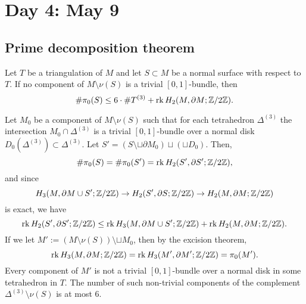\documentclass{../../../small}
\begin{document}
\newpage
\section{Day 4: May 9}
\setcounter{section}{3}
\setcounter{subsection}{3}
\setcounter{thm}{7}

\subsection{Prime decomposition theorem}
\begin{prop}
Let $T$ be a triangulation of $M$ and let $S\subset M$ be a normal surface with respect to $T$.
If no component of $M\setminus\nu(S)$ is a trivial $[0,1]$-bundle, then
\[\#\pi_0(S)\le6\cdot\#T^{(3)}+\operatorname{rk} H_2(M,\partial M;\mathbb{Z}/2\mathbb{Z}).\]
\end{prop}
\begin{pf}
Let $M_0$ be a component of $M\setminus\nu(S)$ such that for each tetrahedron $\Delta^{(3)}$ the intersection $M_0\cap\Delta^{(3)}$ is a trivial $[0,1]$-bundle over a normal disk $D_0(\Delta^{(3)})\subset\Delta^{(3)}$.
Let $S'=(S\setminus\sqcup\partial M_0)\sqcup(\sqcup D_0)$.
Then,
\[\#\pi_0(S)=\#\pi_0(S')=\operatorname{rk} H_2(S',\partial S';\mathbb{Z}/2\mathbb{Z}),\]
and since
\[H_3(M,\partial M\cup S';\mathbb{Z}/2\mathbb{Z})\to H_2(S',\partial S;\mathbb{Z}/2\mathbb{Z})\to H_2(M,\partial M;\mathbb{Z}/2\mathbb{Z})\]
is exact, we have
\[\operatorname{rk} H_2(S',\partial S';\mathbb{Z}/2\mathbb{Z})\le\operatorname{rk} H_3(M,\partial M\cup S';\mathbb{Z}/2\mathbb{Z})+\operatorname{rk} H_2(M,\partial M;\mathbb{Z}/2\mathbb{Z}).\]
If we let $M':=(M\setminus\nu(S))\setminus\sqcup M_0$, then by the excision theorem,
\[\operatorname{rk} H_3(M,\partial M;\mathbb{Z}/2\mathbb{Z})=\operatorname{rk} H_3(M',\partial M';\mathbb{Z}/2\mathbb{Z})=\pi_0(M').\]
Every component of $M'$ is not a trivial $[0,1]$-bundle over a normal disk in some tetrahedron in $T$.
The number of such non-trivial components of the complement $\Delta^{(3)}\setminus\nu(S)$ is at most 6.
\end{pf}
\end{document}
